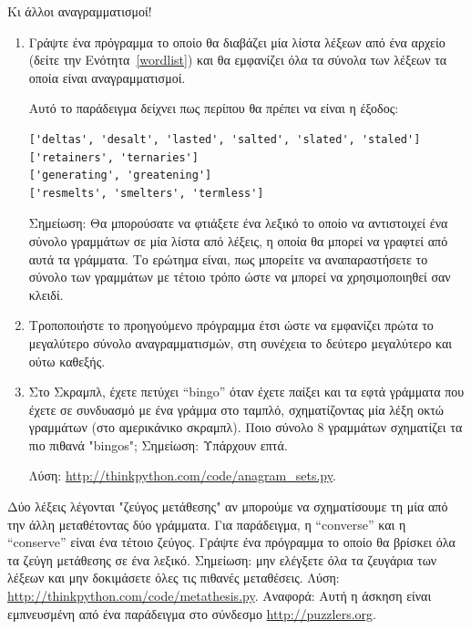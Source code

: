 \documentclass[10pt]{book}
\begin{document}
\begin{exercise}
\label{anagrams}

Κι άλλοι αναγραμματισμοί!

\begin{enumerate}

\item Γράψτε ένα πρόγραμμα το οποίο θα διαβάζει μία λίστα λέξεων από ένα αρχείο (δείτε την Ενότητα~\ref{wordlist}) και θα εμφανίζει όλα τα σύνολα των λέξεων τα οποία είναι αναγραμματισμοί.

Αυτό το παράδειγμα δείχνει πως περίπου θα πρέπει να είναι η έξοδος:

\begin{verbatim}
['deltas', 'desalt', 'lasted', 'salted', 'slated', 'staled']
['retainers', 'ternaries']
['generating', 'greatening']
['resmelts', 'smelters', 'termless']
\end{verbatim}
%
Σημείωση: Θα μπορούσατε να φτιάξετε ένα λεξικό το οποίο να αντιστοιχεί ένα σύνολο γραμμάτων σε μία λίστα από λέξεις, η οποία θα μπορεί να γραφτεί από αυτά τα γράμματα. Το ερώτημα είναι, πως μπορείτε να αναπαραστήσετε το σύνολο των γραμμάτων με τέτοιο τρόπο ώστε να μπορεί να χρησιμοποιηθεί σαν κλειδί.

\item Τροποποιήστε το προηγούμενο πρόγραμμα έτσι ώστε να εμφανίζει πρώτα το μεγαλύτερο σύνολο αναγραμματισμών, στη συνέχεια το δεύτερο μεγαλύτερο και ούτω καθεξής.

\item Στο Σκραμπλ, έχετε πετύχει ``bingo'' όταν έχετε παίξει και τα εφτά γράμματα που έχετε σε συνδυασμό με ένα γράμμα στο ταμπλό, σχηματίζοντας μία λέξη οκτώ γραμμάτων (στο αμερικάνικο σκραμπλ). Ποιο σύνολο 8 γραμμάτων σχηματίζει τα πιο πιθανά "bingos"; Σημείωση: Υπάρχουν επτά.


Λύση: \url{http://thinkpython.com/code/anagram_sets.py}.
\\
\end{enumerate}

\end{exercise}


\begin{exercise}

Δύο λέξεις λέγονται "ζεύγος μετάθεσης" αν μπορούμε να σχηματίσουμε τη μία από την άλλη μεταθέτοντας δύο γράμματα. Για παράδειγμα, η ``converse''  και η  ``conserve'' είναι ένα τέτοιο ζεύγος. Γράψτε ένα πρόγραμμα το οποίο θα βρίσκει όλα τα ζεύγη μετάθεσης σε ένα λεξικό. Σημείωση: μην ελέγξετε όλα τα ζευγάρια των λέξεων και μην δοκιμάσετε όλες τις πιθανές μεταθέσεις. Λύση: \url{http://thinkpython.com/code/metathesis.py}. Αναφορά: Αυτή η άσκηση είναι εμπνευσμένη από ένα παράδειγμα στο σύνδεσμο \url{http://puzzlers.org}.
\\
\end{exercise}
\end{document}
